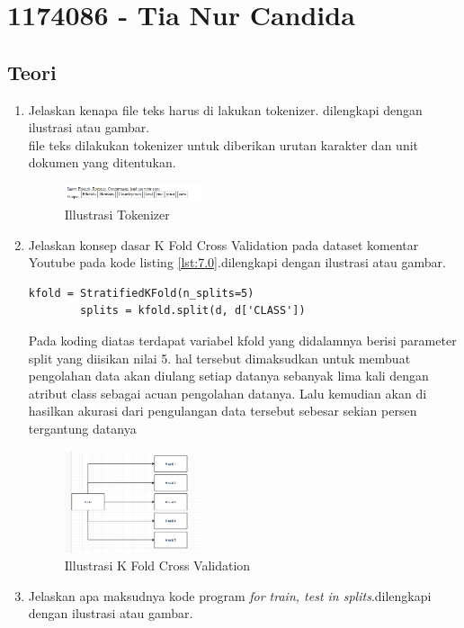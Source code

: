 \section{1174086 - Tia Nur Candida}

\subsection{Teori}
\begin{enumerate}
	\item Jelaskan kenapa file teks harus di lakukan tokenizer. dilengkapi dengan ilustrasi atau gambar. \\
	file teks dilakukan tokenizer untuk diberikan urutan karakter dan unit dokumen yang ditentukan.
	\hfill \break
	\begin{figure}[H]
		\includegraphics[width=4cm]{figures/1174086/7/1.PNG}
		\centering
		\caption{Illustrasi Tokenizer}
	\end{figure}
	\item Jelaskan konsep dasar K Fold Cross Validation pada dataset komentar Youtube pada kode listing \ref{lst:7.0}.dilengkapi dengan ilustrasi atau gambar.
	\hfill \break
	\begin{lstlisting}[caption=K Fold Cross Validation,label={lst:7.0}]
		kfold = StratifiedKFold(n_splits=5)
		splits = kfold.split(d, d['CLASS'])
	\end{lstlisting}
	Pada koding diatas terdapat variabel kfold yang didalamnya berisi parameter split yang diisikan nilai 5. hal tersebut dimaksudkan untuk membuat pengolahan data akan diulang setiap datanya sebanyak lima kali dengan atribut class sebagai acuan pengolahan datanya. Lalu kemudian akan di hasilkan akurasi dari pengulangan data tersebut sebesar sekian persen tergantung datanya
	\begin{figure}[H]
    	\includegraphics[width=4cm]{figures/1174086/7/2.png}
    	\centering
    	\caption{Illustrasi K Fold Cross Validation}
	\end{figure}
	\item Jelaskan apa maksudnya kode program \emph{for train, test in splits}.dilengkapi dengan ilustrasi atau gambar.

\end{enumerate}
